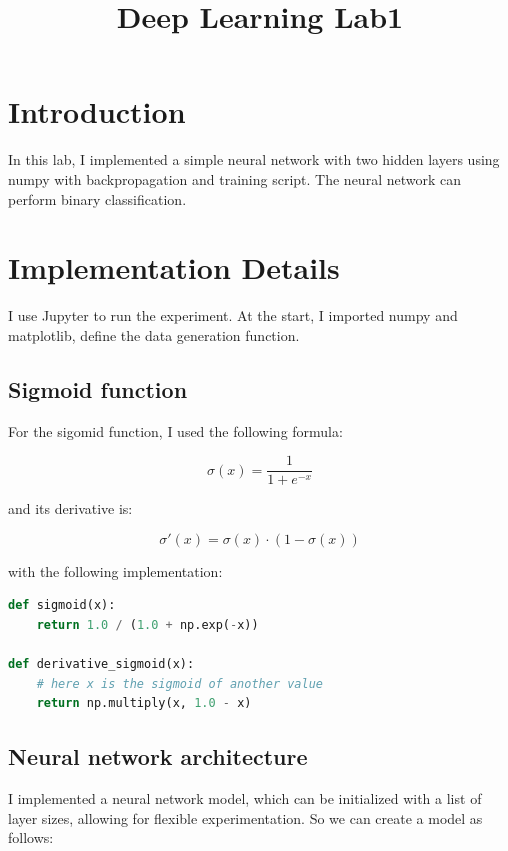 \documentclass{homework}
\begin{document}
\title{Deep Learning Lab1}
\author{\chineseName \masterStudentID}
\date{}
\maketitle

\section{Introduction}

In this lab, I implemented a simple neural network with two hidden layers using numpy with backpropagation and training script. The neural network can perform binary classification. 

\section{Implementation Details}

I use Jupyter to run the experiment. At the start, I imported numpy and matplotlib, define the data generation function.

\subsection{Sigmoid function}

For the sigomid function, I used the following formula:

\[
    \sigma(x) = \frac{1}{1 + e^{-x}}
\]

and its derivative is:

\[
    \sigma'(x) = \sigma(x) \cdot (1 - \sigma(x))
\]

with the following implementation:

\begin{lstlisting}[language=Python]
def sigmoid(x):
    return 1.0 / (1.0 + np.exp(-x))

def derivative_sigmoid(x):
    # here x is the sigmoid of another value
    return np.multiply(x, 1.0 - x)
\end{lstlisting}

\subsection{Neural network architecture}

I implemented a neural network model, which can be initialized with a list of layer sizes, allowing for flexible experimentation. So we can create a model as follows:
\end{document}
